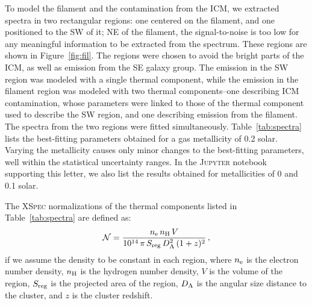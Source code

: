 To model the filament and the contamination from the ICM, we extracted spectra in two rectangular regions: one centered on the filament, and one positioned to the SW of it; NE of the filament, the signal-to-noise is too low for any meaningful information to be extracted from the spectrum. These regions are shown in Figure~\ref{fig:fil}. The regions were chosen to avoid the bright parts of the ICM, as well as emission from the SE galaxy group. The emission in the SW region was modeled with a single thermal component, while the emission in the filament region was modeled with two thermal components--one describing ICM contamination, whose parameters were linked to those of the thermal component used to describe the SW region, and one describing emission from the filament. The spectra from the two regions were fitted simultaneously. Table~\ref{tab:spectra} lists the best-fitting parameters obtained for a gas metallicity of 0.2 solar. Varying the metallicity causes only minor changes to the best-fitting parameters, well within the statistical uncertainty ranges. In the \textsc{Jupyter} notebook supporting this letter, we also list the results obtained for metallicities of 0 and 0.1 solar.

The \textsc{XSpec} normalizations of the thermal components listed in Table~\ref{tab:spectra} are defined as:
\begin{equation}
	\mathcal{N} = \frac{n_{\rm e} \, n_{\rm H} \, V}{10^{14} \, \pi \, S_{\rm reg} \, D_{\rm A}^2 \, (1+z)^2} \, , \nonumber
\end{equation}
if we assume the density to be constant in each region, where $n_{\rm e}$ is the electron number density, $n_{\rm H}$ is the hydrogen number density, $V$ is the volume of the region, $S_{\rm reg}$ is the projected area of the region, $D_{\rm A}$ is the angular size distance to the cluster, and $z$ is the cluster redshift.

